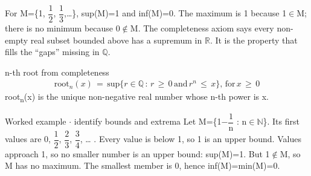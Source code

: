 \documentclass[11pt]{article}
\begin{document}
\begin{keepsection}
\begin{center}
\begin{minipage}[t]{0.950\linewidth}\centering
{}\par{}\end{minipage}
\end{center}

For M=\{1, {\small\ensuremath{\dfrac{1}{2}}}, {\small\ensuremath{\dfrac{1}{3}}},…\}, sup(M)=1 and inf(M)=0. The maximum is 1 because 1\ensuremath{\in}M; there is no minimum because 0\ensuremath{\notin}M. The completeness axiom says every non-empty real subset bounded above has a supremum in \ensuremath{\mathbb{R}}. It is the property that fills the “gaps” missing in \ensuremath{\mathbb{Q}}.

\begin{equationcard}{n-th root from completeness}
\[ \begin{gathered} \text{root}_{{n}}({x})\, =\, \text{sup}\{{r}\in \mathbb{Q}\, :\, {r}\, \geq \, 0\, \text{and}\, {r}^{{n}}\, \leq \, {x}\},\, \text{for}\, {x}\, \geq \, 0 \end{gathered} \]
{\small root\textsubscript{n}(x) is the unique non-negative real number whose n-th power is x.}
\end{equationcard}

\begin{workedbox}{Worked example \ensuremath{\cdot} identify bounds and extrema}
Let M=\{1\ensuremath{-}{\small\ensuremath{\dfrac{1}{\mathrm{n}}}} : n\ensuremath{\in}\ensuremath{\mathbb{N}}\}. Its first values are 0, {\small\ensuremath{\dfrac{1}{2}}}, {\small\ensuremath{\dfrac{2}{3}}}, {\small\ensuremath{\dfrac{3}{4}}}, … . Every value is below 1, so 1 is an upper bound. Values approach 1, so no smaller number is an upper bound: sup(M)=1. But 1\ensuremath{\notin}M, so M has no maximum. The smallest member is 0, hence inf(M)=min(M)=0.
\end{workedbox}


\end{keepsection}
\end{document}
